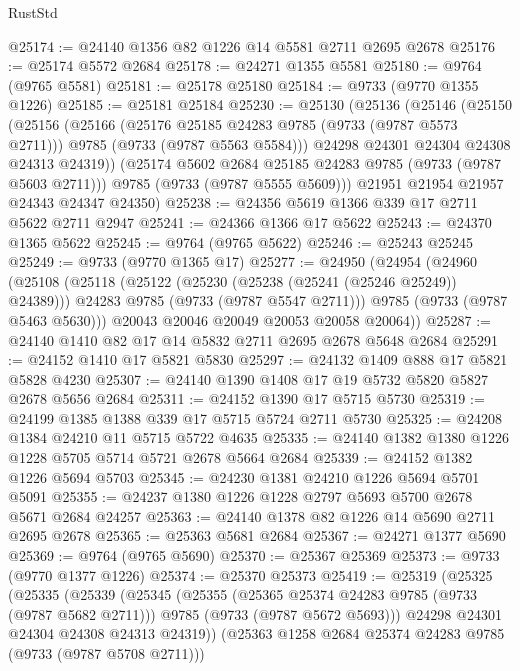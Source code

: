 \begin{lexlean}{RustStd}
\begin{coremodule}
{\begin{coremodule}
{{{{{{{{{{{{{{{{{{{{{{{{{{{{{{{{{{{{{{{{{{{{{{{{{{{{{{{@25174 := @24140 @1356 @82 @1226 @14 @5581 @2711 @2695 @2678
@25176 := @25174 @5572 @2684
@25178 := @24271 @1355 @5581
@25180 := @9764 (@9765 @5581)
@25181 := @25178 @25180
@25184 := @9733 (@9770 @1355 @1226)
@25185 := @25181 @25184
@25230 := @25130
    (@25136
      (@25146
        (@25150
          (@25156
            (@25166
              (@25176 @25185 @24283 @9785 (@9733 (@9787 @5573 @2711)))
              @9785
              (@9733 (@9787 @5563 @5584)))
            @24298
            @24301
            @24304
            @24308
            @24313
            @24319))
        (@25174 @5602 @2684 @25185 @24283 @9785 (@9733 (@9787 @5603 @2711)))
        @9785
        (@9733 (@9787 @5555 @5609)))
      @21951
      @21954
      @21957
      @24343
      @24347
      @24350)
@25238 := @24356 @5619 @1366 @339 @17 @2711 @5622 @2711 @2947
@25241 := @24366 @1366 @17 @5622
@25243 := @24370 @1365 @5622
@25245 := @9764 (@9765 @5622)
@25246 := @25243 @25245
@25249 := @9733 (@9770 @1365 @17)
@25277 := @24950
    (@24954
      (@24960
        (@25108
          (@25118
            (@25122 (@25230 (@25238 (@25241 (@25246 @25249)) @24389)))
            @24283
            @9785
            (@9733 (@9787 @5547 @2711)))
          @9785
          (@9733 (@9787 @5463 @5630)))
        @20043
        @20046
        @20049
        @20053
        @20058
        @20064))
@25287 := @24140 @1410 @82 @17 @14 @5832 @2711 @2695 @2678 @5648 @2684
@25291 := @24152 @1410 @17 @5821 @5830
@25297 := @24132 @1409 @888 @17 @5821 @5828 @4230
@25307 := @24140 @1390 @1408 @17 @19 @5732 @5820 @5827 @2678 @5656 @2684
@25311 := @24152 @1390 @17 @5715 @5730
@25319 := @24199 @1385 @1388 @339 @17 @5715 @5724 @2711 @5730
@25325 := @24208 @1384 @24210 @11 @5715 @5722 @4635
@25335 := @24140 @1382 @1380 @1226 @1228 @5705 @5714 @5721 @2678 @5664 @2684
@25339 := @24152 @1382 @1226 @5694 @5703
@25345 := @24230 @1381 @24210 @1226 @5694 @5701 @5091
@25355 := @24237 @1380 @1226 @1228 @2797 @5693 @5700 @2678 @5671 @2684 @24257
@25363 := @24140 @1378 @82 @1226 @14 @5690 @2711 @2695 @2678
@25365 := @25363 @5681 @2684
@25367 := @24271 @1377 @5690
@25369 := @9764 (@9765 @5690)
@25370 := @25367 @25369
@25373 := @9733 (@9770 @1377 @1226)
@25374 := @25370 @25373
@25419 := @25319
    (@25325
      (@25335
        (@25339
          (@25345
            (@25355
              (@25365 @25374 @24283 @9785 (@9733 (@9787 @5682 @2711)))
              @9785
              (@9733 (@9787 @5672 @5693)))
            @24298
            @24301
            @24304
            @24308
            @24313
            @24319))
        (@25363 @1258 @2684 @25374 @24283 @9785 (@9733 (@9787 @5708 @2711)))
}}}}}}}}}}}}}}}}}}}}}}}}}}}}}}}}}}}}}}}}}}}}}}}}}}}}}}}
\end{coremodule}}
\end{coremodule}
\end{lexlean}
